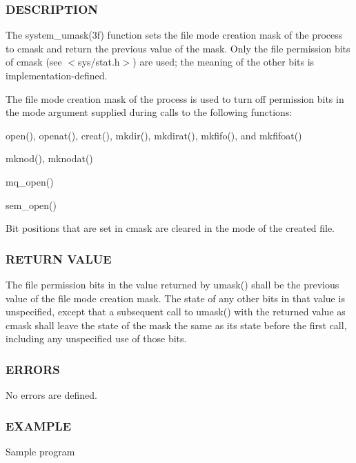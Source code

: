 \subsubsection*{D\+E\+S\+C\+R\+I\+P\+T\+I\+ON}

The system\+\_\+umask(3f) function sets the file mode creation mask of the process to cmask and return the previous value of the mask. Only the file permission bits of cmask (see $<$sys/stat.\+h$>$) are used; the meaning of the other bits is implementation-\/defined.

The file mode creation mask of the process is used to turn off permission bits in the mode argument supplied during calls to the following functions\+:


\begin{DoxyItemize}
\item open(), openat(), creat(), mkdir(), mkdirat(), mkfifo(), and mkfifoat()
\item mknod(), mknodat()
\item mq\+\_\+open()
\item sem\+\_\+open()
\end{DoxyItemize}

Bit positions that are set in cmask are cleared in the mode of the created file.

\subsubsection*{R\+E\+T\+U\+RN V\+A\+L\+UE}

The file permission bits in the value returned by umask() shall be the previous value of the file mode creation mask. The state of any other bits in that value is unspecified, except that a subsequent call to umask() with the returned value as cmask shall leave the state of the mask the same as its state before the first call, including any unspecified use of those bits.

\subsubsection*{E\+R\+R\+O\+RS}

No errors are defined.

\subsubsection*{E\+X\+A\+M\+P\+LE}

Sample program

